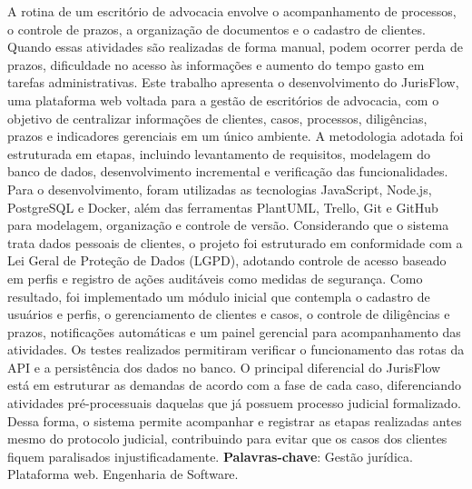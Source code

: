 %
\begin{RESUMO}
\thispagestyle{empty}

A rotina de um escritório de advocacia envolve o acompanhamento de processos, o controle de prazos, a organização de documentos e o cadastro de clientes. Quando essas atividades são realizadas de forma manual, 
podem ocorrer perda de prazos, dificuldade no acesso às informações e aumento do tempo gasto em tarefas administrativas. Este trabalho apresenta o desenvolvimento do JurisFlow, uma plataforma web voltada 
para a gestão de escritórios de advocacia, com o objetivo de centralizar informações de clientes, casos, processos, diligências, prazos e indicadores gerenciais em um único ambiente. 
A metodologia adotada foi estruturada em etapas, incluindo levantamento de requisitos, modelagem do banco de dados, desenvolvimento incremental e verificação das funcionalidades. Para o desenvolvimento, 
foram utilizadas as tecnologias JavaScript, Node.js, PostgreSQL e Docker, além das ferramentas PlantUML, Trello, Git e GitHub para modelagem, organização e controle de versão.
Considerando que o sistema trata dados pessoais de clientes, o projeto foi estruturado em conformidade com a Lei Geral de Proteção de Dados (LGPD), adotando controle de acesso baseado em perfis e registro de 
ações auditáveis como medidas de segurança. Como resultado, foi implementado um módulo inicial que contempla o cadastro de usuários e perfis, o gerenciamento de clientes e casos, o controle de diligências e prazos, 
notificações automáticas e um painel gerencial para acompanhamento das atividades. Os testes realizados permitiram verificar o funcionamento das rotas da API e a persistência dos dados no banco. 
O principal diferencial do JurisFlow está em estruturar as demandas de acordo com a fase de cada caso, diferenciando atividades pré-processuais daquelas que já possuem processo judicial formalizado. 
Dessa forma, o sistema permite acompanhar e registrar as etapas realizadas antes mesmo do protocolo judicial, contribuindo para evitar que os casos dos clientes fiquem paralisados injustificadamente. 
\vspace*{0.5cm}
\noindent\textbf{Palavras-chave}: Gestão jurídica. Plataforma web. Engenharia de Software. 
\end{RESUMO}

